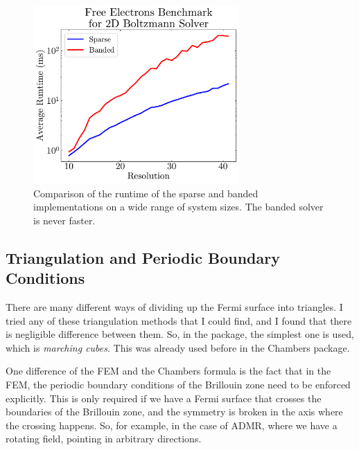 \documentclass[12pt]{article}
\begin{document}
\begin{figure}
    \centering
    \includegraphics[width=0.7\textwidth]{figures/sparse_vs_banded}
    \caption{Comparison of the runtime of the sparse and banded implementations on a wide range of
        system sizes. The banded solver is never faster.}
    \label{fig:sparse_vs_banded}
\end{figure}

\subsection{Triangulation and Periodic Boundary Conditions}
There are many different ways of dividing up the Fermi surface into triangles. I tried any of these
triangulation methods that I could find, and I found that there is negligible difference between
them. So, in the package, the simplest one is used, which is \emph{marching cubes}. This was
already used before in the Chambers package.

One difference of the FEM and the Chambers formula is the fact that in the FEM, the periodic
boundary conditions of the Brillouin zone need to be enforced explicitly. This is only required
if we have a Fermi surface that crosses the boundaries of the Brillouin zone, and the symmetry
is broken in the axis where the crossing happens. So, for example, in the case of ADMR, where
we have a rotating field, pointing in arbitrary directions.
\end{document}
